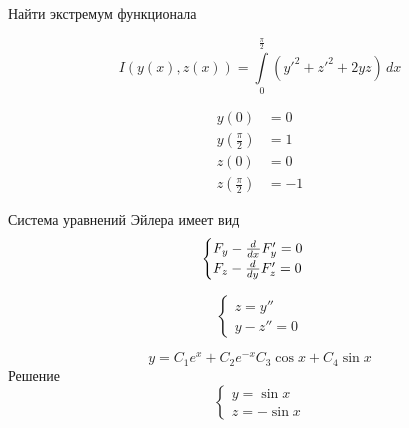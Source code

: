 \begin{example}{Найти экстремум функционала}

\[
I(y(x), z(x)) = \int\limits_0^{\frac{\pi}{2}} (y'^2 + z'^2 + 2 y z)\, dx
\]

\begin{align*}
y(0) &= 0\\
y\left(\frac{\pi}{2}\right) &= 1\\
z(0) &= 0\\
z\left(\frac{\pi}{2}\right) &= -1
\end{align*}

Система уравнений Эйлера имеет вид
\[
\begin{cases}
F_y- \frac{d^{}}{dx^{}} F_y' = 0\\
F_z - \frac{d^{}}{dy^{}} F_z' = 0
\end{cases}
\]

\[
\begin{cases}
z = y''\\
y - z'' = 0
\end{cases}
\]

\[
y = C_1 e^x + C_2 e^{-x} C_3 \cos x + C_4 \sin x
\]
Решение
\[
\begin{cases}
y = \sin x\\
z = - \sin x
\end{cases}
\]
\end{example}

